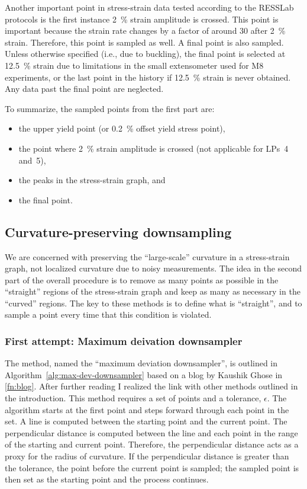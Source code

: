 \documentclass[a4paper,11pt]{article}
\begin{document}
Another important point in stress-strain data tested according to the RESSLab protocols is the first instance 2~\% strain amplitude is crossed.
This point is important because the strain rate changes by a factor of around 30 after 2~\% strain.
Therefore, this point is sampled as well.
A final point is also sampled.
Unless otherwise specified (i.e., due to buckling), the final point is selected at 12.5~\% strain due to limitations in the small extensometer used for M8 experiments, or the last point in the history if 12.5~\% strain is never obtained.
Any data past the final point are neglected.

To summarize, the sampled points from the first part are:
\begin{itemize}
    \item the upper yield point (or 0.2~\% offset yield stress point),
    \item the point where 2~\% strain amplitude is crossed (not applicable for LPs~4 and~5),
    \item the peaks in the stress-strain graph, and
    \item the final point.
\end{itemize}

\subsection{Curvature-preserving downsampling}

We are concerned with preserving the ``large-scale'' curvature in a stress-strain graph, not localized curvature due to noisy measurements.
The idea in the second part of the overall procedure is to remove as many points as possible in the ``straight'' regions of the stress-strain graph and keep as many as necessary in the ``curved'' regions.
The key to these methods is to define what is ``straight'', and to sample a point every time that this condition is violated.

\subsubsection{First attempt: Maximum deivation downsampler}

The method, named the ``maximum deviation downsampler'', is outlined in Algorithm~\ref{alg:max-dev-downsampler} based on a blog by Kaushik Ghose in \cref{fn:blog}.
After further reading I realized the link with other methods outlined in the introduction.
This method requires a set of points and a tolerance, $\epsilon$.
The algorithm starts at the first point and steps forward through each point in the set.
A line is computed between the starting point and the current point.
The perpendicular distance is computed between the line and each point in the range of the starting and current point.
Therefore, the perpendicular distance acts as a proxy for the radius of curvature.
If the perpendicular distance is greater than the tolerance, the point before the current point is sampled; the sampled point is then set as the starting point and the process continues.
\end{document}
